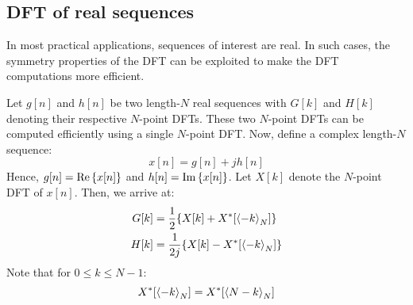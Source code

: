 \documentclass[../../main/main.tex]{subfiles}
\begin{document}

\subsection{DFT of real sequences}
In most practical applications, sequences of interest are real. In such cases, the symmetry properties of the DFT can be exploited to make the DFT computations more efficient.

Let \( g[n] \) and \( h[n] \) be two length-\( N \) real sequences with \( G[k] \) and \( H[k] \) denoting their respective \( N \)-point DFTs. These two \( N \)-point DFTs can be computed efficiently using a single \( N \)-point DFT. Now, define a complex length-\( N \) sequence:
\begin{equation}
    x[n]
    =
    g[n] + jh[n]
    \label{eq:L13_S04_1}
\end{equation}
Hence, \( g[n] = \operatorname{Re}\qty{x[n]} \) and \( h[n] = \operatorname{Im}\qty{x[n]} \). Let \( X[k] \) denote the \( N \)-point DFT of \( x[n] \). Then, we arrive at:
\begin{align}
    G[k] &= \frac{1}{2} \qty{X[k] + X^{*}[\expval{-k}_{N}]} \\
    H[k] &= \frac{1}{2j} \qty{X[k] - X^{*}[\expval{-k}_{N}]}
\end{align}
Note that for \( 0 \le k \le N-1 \):
\begin{equation}
    X^{*}[\expval{-k}_{N}]
    =
    X^{*}[\expval{N-k}_{N}]
    \label{eq:L13_S05_3}
\end{equation}
\end{document}
